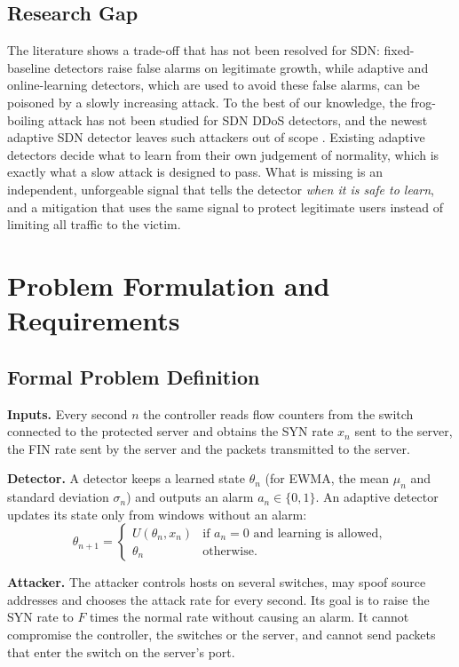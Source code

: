 \documentclass[12pt,a4paper,oneside]{report}
\begin{document}
\section{Research Gap}
The literature shows a trade-off that has not been resolved for SDN: fixed-baseline detectors raise false alarms on legitimate growth, while adaptive and online-learning detectors, which are used to avoid these false alarms, can be poisoned by a slowly increasing attack. To the best of our knowledge, the frog-boiling attack has not been studied for SDN DDoS detectors, and the newest adaptive SDN detector leaves such attackers out of scope \citep{zhang2026time}. Existing adaptive detectors decide what to learn from their own judgement of normality, which is exactly what a slow attack is designed to pass. What is missing is an independent, unforgeable signal that tells the detector \emph{when it is safe to learn}, and a mitigation that uses the same signal to protect legitimate users instead of limiting all traffic to the victim.

\chapter{Problem Formulation and Requirements}
\section{Formal Problem Definition}
\textbf{Inputs.} Every second $n$ the controller reads flow counters from the switch connected to the protected server and obtains the SYN rate $x_n$ sent to the server, the FIN rate sent by the server and the packets transmitted to the server.

\textbf{Detector.} A detector keeps a learned state $\theta_n$ (for EWMA, the mean $\mu_n$ and standard deviation $\sigma_n$) and outputs an alarm $a_n \in \{0,1\}$. An adaptive detector updates its state only from windows without an alarm:
\begin{equation}\label{eq:update}
\theta_{n+1} = \begin{cases} U(\theta_n, x_n) & \text{if } a_n = 0 \text{ and learning is allowed},\\ \theta_n & \text{otherwise.}\end{cases}
\end{equation}

\textbf{Attacker.} The attacker controls hosts on several switches, may spoof source addresses and chooses the attack rate for every second. Its goal is to raise the SYN rate to $F$ times the normal rate without causing an alarm. It cannot compromise the controller, the switches or the server, and cannot send packets that enter the switch on the server's port.
\end{document}
